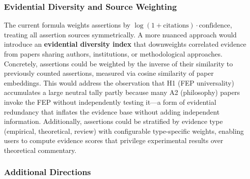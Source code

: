 \documentclass[
]{article}
\begin{document}
\subsubsection{Evidential Diversity and Source
Weighting}\label{evidential-diversity-and-source-weighting}

The current formula weights assertions by
\(\log(1 + \text{citations}) \cdot \text{confidence}\), treating all
assertion sources symmetrically. A more nuanced approach would introduce
an \textbf{evidential diversity index} that downweights correlated
evidence from papers sharing authors, institutions, or methodological
approaches. Concretely, assertions could be weighted by the inverse of
their similarity to previously counted assertions, measured via cosine
similarity of paper embeddings. This would address the observation that
H1 (FEP universality) accumulates a large neutral tally partly because
many A2 (philosophy) papers invoke the FEP without independently testing
it---a form of evidential redundancy that inflates the evidence base
without adding independent information. Additionally, assertions could
be stratified by evidence type (empirical, theoretical, review) with
configurable type-specific weights, enabling users to compute evidence
scores that privilege experimental results over theoretical commentary.

\subsubsection{Additional Directions}\label{additional-directions}

\end{document}
